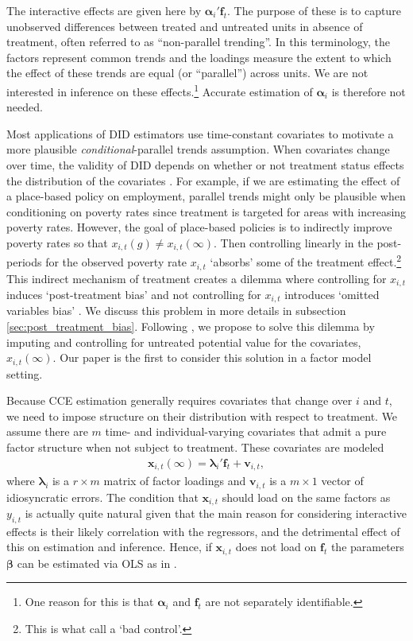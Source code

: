 \documentclass[12pt,fleqn]{article}
\def\*#1{\mathbf{#1}}
\def\+#1{\boldsymbol{#1}}
\begin{document}
The interactive effects are given here by $\+\alpha_i'\*f_t$. The purpose of these is to capture unobserved differences between treated and untreated units in absence of treatment, often referred to as ``non-parallel trending''. In this terminology, the factors represent common trends and the loadings measure the extent to which the effect of these trends are equal (or ``parallel'') across units. We are not interested in inference on these effects.\footnote{One reason for this is that $\+\alpha_i$ and $\*f_t$ are not separately identifiable.} Accurate estimation of $\+\alpha_i$ is therefore not needed.

Most applications of DID estimators use time-constant covariates to motivate a more plausible \emph{conditional}-parallel trends assumption. When covariates change over time, the validity of DID depends on whether or not treatment status effects the distribution of the covariates \citep{Caetano_Callaway_Payne_Rodrigues_2022}. For example, if we are estimating the effect of a place-based policy on employment, parallel trends might only be plausible when conditioning on poverty rates since treatment is targeted for areas with increasing poverty rates. However, the goal of place-based policies is to indirectly improve poverty rates so that $x_{i,t}(g) \neq x_{i,t}(\infty)$. Then controlling linearly in the post-periods for the observed poverty rate $x_{i,t}$ `absorbs' some of the treatment effect.\footnote{This is what \citet{angrist2009mostly} call a `bad control'.} This indirect mechanism of treatment creates a dilemma where controlling for $x_{i,t}$ induces `post-treatment bias' and not controlling for $x_{i,t}$ introduces `omitted variables bias' \citep{aklin2017can}. We discuss this problem in more details in subsection \ref{sec:post_treatment_bias}. Following \citet{Caetano_Callaway_Payne_Rodrigues_2022}, we propose to solve this dilemma by imputing and controlling for untreated potential value for the covariates, $x_{i,t}(\infty)$. Our paper is the first to consider this solution in a factor model setting. 

Because CCE estimation generally requires covariates that change over $i$ and $t$, we need to impose structure on their distribution with respect to treatment. We assume there are $m$ time- and individual-varying covariates that admit a pure factor structure when not subject to treatment. These covariates are modeled
\begin{align}
\*x_{i,t}(\infty) = \+\lambda_i'\*f_t + \*v_{i,t}, \label{x}
\end{align}
where $\+\lambda_i$ is a $r \times m$ matrix of factor loadings and $\+ v_{i,t}$ is a $m \times 1$ vector of idiosyncratic errors. The condition that $\*x_{i,t}$ should load on the same factors as $y_{i,t}$ is actually quite natural given that the main reason for considering interactive effects is their likely correlation with the regressors, and the detrimental effect of this on estimation and inference. Hence, if $\*x_{i,t}$ does not load on $\*f_{t}$ the parameters $\+\beta$ can be estimated via OLS as in \citet{Wooldridge_2005}.
\end{document}
